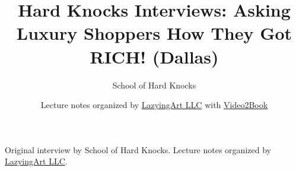 \documentclass[11pt,oneside]{book}
\begin{document}
\frontmatter
\title{Hard Knocks Interviews: Asking Luxury Shoppers How They Got RICH! (Dallas)}
\author{School of Hard Knocks}
\date{Lecture notes organized by \href{https://lazying.art}{LazyingArt LLC} with \href{https://github.com/lachlanchen/Video2Book}{Video2Book}}
\maketitle
\begin{center}
\small Original interview by School of Hard Knocks. Lecture notes organized by \href{https://lazying.art}{LazyingArt LLC}.
\end{center}
\clearpage
\mainmatter

\end{document}
